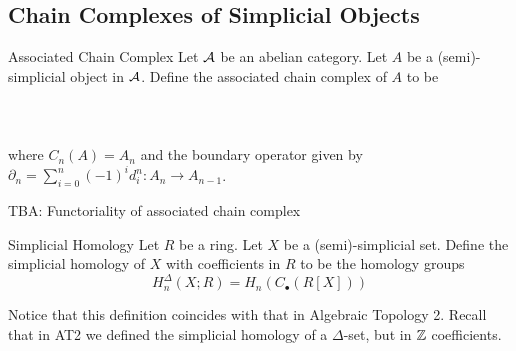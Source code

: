 \documentclass[a4paper]{article}
\begin{document}
\subsection{Chain Complexes of Simplicial Objects}
\begin{defn}{Associated Chain Complex}{} Let $\mathcal{A}$ be an abelian category. Let $A$ be a (semi)-simplicial object in $\mathcal{A}$. Define the associated chain complex of $A$ to be \\~\\
\\~\\
where $C_n(A)=A_n$ and the boundary operator given by $\partial_n=\sum_{i=0}^n(-1)^id_i^n:A_n\to A_{n-1}$. 
\end{defn}

TBA: Functoriality of associated chain complex

\begin{defn}{Simplicial Homology}{} Let $R$ be a ring. Let $X$ be a (semi)-simplicial set. Define the simplicial homology of $X$ with coefficients in $R$ to be the homology groups $$H_n^\Delta(X;R)=H_n(C_\bullet(R[X]))$$
\end{defn}

Notice that this definition coincides with that in Algebraic Topology 2. Recall that in AT2 we defined the simplicial homology of a $\Delta$-set, but in $\mathbb{Z}$ coefficients. 
\end{document}
